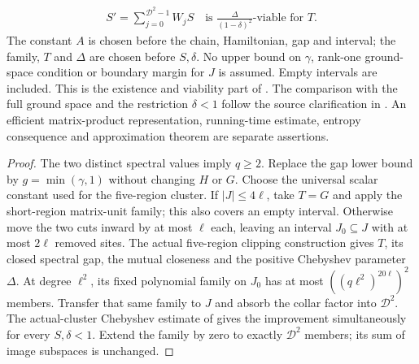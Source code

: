 \begin{lemma}
    \begin{align}
        S'=\sum_{j=0}^{\mathcal D^2-1}W_jS
        \quad\text{is }\frac{\Delta}{(1-\delta)^2}\text{-viable for }T.
    \end{align}
    The constant $A$ is chosen before the chain, Hamiltonian, gap and interval;
    the family, $T$ and $\Delta$ are chosen before $S,\delta$.
    No upper bound on $\gamma$, rank-one ground-space condition or boundary
    margin for $J$ is assumed. Empty intervals are included.
    This is the existence and viability part of
    \cite[Theorem t:ais, lines 1010--1024]{Arad2016RigorousRG}.
    The comparison with the full ground space and the restriction $\delta<1$
    follow the source clarification in
    \cite{gap:alvv16_spectral_projector_boundary}.
    An efficient matrix-product representation, running-time estimate,
    entropy consequence and approximation theorem are separate assertions.
\end{lemma}
\begin{proof}
    \leanok
    The two distinct spectral values imply $q\ge2$. Replace the gap lower
    bound by $g=\min(\gamma,1)$ without changing $H$ or $G$.
    Choose the universal scalar constant used for the five-region cluster.
    If $|J|\le4\ell$, take $T=G$ and apply the short-region matrix-unit
    family; this also covers an empty interval.
    Otherwise move the two cuts inward by at most $\ell$ each, leaving an
    interval $J_0\subseteq J$ with at most $2\ell$ removed sites.
    The actual five-region clipping construction gives $T$, its closed
    spectral gap, the mutual closeness and the positive Chebyshev parameter
    $\Delta$. At degree $\ell^2$, its fixed polynomial family on $J_0$
    has at most $((q\ell^2)^{20\ell})^2$ members. Transfer that same family
    to $J$ and absorb the collar factor into $\mathcal D^2$.
    The actual-cluster Chebyshev estimate of
    \cite[``An actual matrix cluster and a fixed polynomial family'']
    {QICLean2026Blueprint} gives the improvement simultaneously for every
    $S,\delta<1$. Extend the family by zero to exactly $\mathcal D^2$
    members; its sum of image subspaces is unchanged.
\end{proof}

